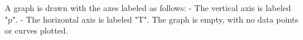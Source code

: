 A graph is drawn with the axes labeled as follows:  
- The vertical axis is labeled "p".  
- The horizontal axis is labeled "T".  
The graph is empty, with no data points or curves plotted.